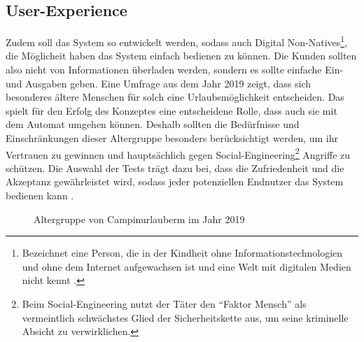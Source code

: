 \subsection{User-Experience}
Zudem soll das System so entwickelt werden, sodass auch Digital Non-Natives\footnote{Bezeichnet
eine Person, die in der Kindheit ohne Informationstechnologien und ohne dem Internet aufgewachsen ist 
und eine Welt mit digitalen Medien nicht kennt \cite{misc:MSND}.}, die Möglicheit \cite{refart:QWDN} haben
das System einfach bedienen zu können. Die Kunden sollten also nicht von Informationen überladen werden, 
sondern es sollte einfache Ein- und Ausgaben geben. Eine Umfrage aus dem Jahr 2019 \cite{periodical:AdCJ}
zeigt, dass sich besonderes ältere Menschen \cite{periodical:AdCJ} für solch eine Urlaubsmöglichkeit entscheiden.
Das spielt für den Erfolg des Konzeptes eine entscheidene Rolle, dass auch sie mit dem Automat umgehen können. 
Deshalb sollten die Bedürfnisse und Einschränkungen dieser Altergruppe besonders berücksichtigt werden, um ihr 
Vertrauen zu gewinnen \cite{refart:HLAU} und hauptsächlich gegen Social-Engineering\footnote{Beim Social-Engineering 
nutzt der Täter den ``Faktor Mensch'' als vermeintlich schwächstes Glied der Sicherheitskette aus, um seine kriminelle
Absicht zu verwirklichen.\cite{booklet:BSSE}} Angriffe zu schützen. Die Auswahl der Tests trägt dazu bei, dass die 
Zufriedenheit und die Akzeptanz gewährleistet wird, sodass jeder potenziellen Endnutzer das System bedienen kann 
\cite{refbook:IASE}.

\vfill
\begin{figure}[H]
    \caption{Altergruppe von Campinurlauberm im Jahr 2019\cite{periodical:AdCJ}}
    \label{fig:periodical_AdCJ}
\end{figure}


